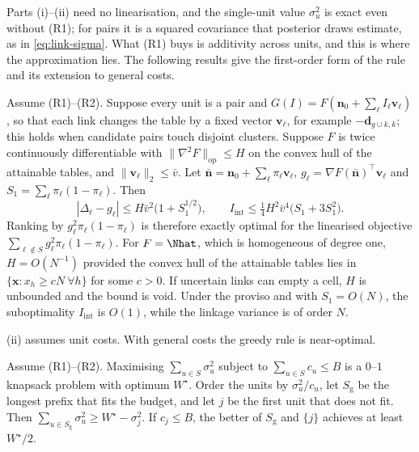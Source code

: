 Parts (i)--(ii) need no linearisation, and the single-unit value $\sigma_u^2$ is exact even without (R1); for pairs it is a squared covariance that posterior draws estimate, as in \eqref{eq:link-sigma}. What (R1) buys is additivity across units, and this is where the approximation lies. The following results give the first-order form of the rule and its extension to general costs.

\begin{proposition}\label{prop:review-linear}
Assume (R1)--(R2). Suppose every unit is a pair and $G(I)=F(\bm n_0+\sum_\ell I_\ell\bm v_\ell)$, so that each link changes the table by a fixed vector $\bm v_\ell$, for example $-\bm d_{g\cup k,k}$; this holds when candidate pairs touch disjoint clusters. Suppose $F$ is twice continuously differentiable with $\|\nabla^2F\|_{\mathrm{op}}\le H$ on the convex hull of the attainable tables, and $\|\bm v_\ell\|_2\le\bar v$. Let $\bar{\bm n}=\bm n_0+\sum_\ell\pi_\ell\bm v_\ell$, $g_\ell=\nabla F(\bar{\bm n})^{\top}\bm v_\ell$ and $S_1=\sum_\ell\pi_\ell(1-\pi_\ell)$. Then
  \[
    |\Delta_\ell-g_\ell|\le H\bar v^2\bigl(1+S_1^{1/2}\bigr),\qquad
    I_{\mathrm{int}}\le\tfrac14H^2\bar v^4\bigl(S_1+3S_1^2\bigr).
  \]
  Ranking by $g_\ell^2\pi_\ell(1-\pi_\ell)$ is therefore exactly optimal for the linearised objective $\sum_{\ell\notin S}g_\ell^2\pi_\ell(1-\pi_\ell)$. For $F=\Nhat$, which is homogeneous of degree one, $H=O(N^{-1})$ provided the convex hull of the attainable tables lies in $\{\bm x:x_h\ge cN\ \forall h\}$ for some $c>0$. If uncertain links can empty a cell, $H$ is unbounded and the bound is void. Under the proviso and with $S_1=O(N)$, the suboptimality $I_{\mathrm{int}}$ is $O(1)$, while the linkage variance is of order $N$.
\end{proposition}

(ii) assumes unit costs. With general costs the greedy rule is near-optimal.

\begin{proposition}\label{prop:review-costs}
Assume (R1)--(R2). Maximising $\sum_{u\in S}\sigma_u^2$ subject to $\sum_{u\in S}c_u\le B$ is a $0$--$1$ knapsack problem with optimum $W^\star$. Order the units by $\sigma_u^2/c_u$, let $S_{\mathrm g}$ be the longest prefix that fits the budget, and let $j$ be the first unit that does not fit. Then $\sum_{u\in S_{\mathrm g}}\sigma_u^2\ge W^\star-\sigma_j^2$. If $c_j\le B$, the better of $S_{\mathrm g}$ and $\{j\}$ achieves at least $W^\star/2$.
\end{proposition}

